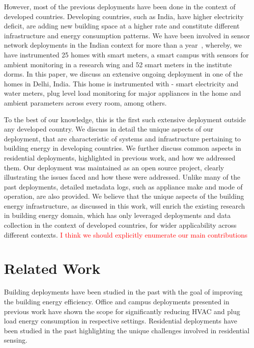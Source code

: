\documentclass[10pt]{sensys-proc}
\newcommand{\redcolor}[1]{\textcolor{red}{#1}}
\begin{document}
 However, most of the previous deployments have been done in the context of developed countries. Developing countries, such as India, have higher electricity deficit, are adding new building space at a higher rate and constitute different infrastructure and energy consumption patterns. %
We have been involved in sensor network deployments in the Indian context for more than a year~\cite{batra}, whereby, we have instrumented 25 homes with smart meters, a smart campus with sensors for ambient monitoring in a research wing and 52 smart meters in the institute dorms. In this paper, we discuss an extensive ongoing deployment in one of the homes in Delhi, India. This home is instrumented with - smart electricity and water meters, plug level load monitoring for major appliances in the home and ambient parameters across every room, among others. 

 To the best of our knowledge, this is the first such extensive deployment outside any developed country. We discuss in detail the unique aspects of our deployment, that are characteristic of systems and infrastructure pertaining to building energy in developing countries. We further discuss common aspects in residential deployments, highlighted in previous work, and how we addressed them. Our deployment was maintained as an open source project, clearly illustrating the issues faced and how these were addressed. Unlike many of the past deployments, detailed metadata logs, such as appliance make and mode of operation, are also provided. We believe that the unique aspects of the building energy infrastructure, as discussed in this work, will enrich the existing research in building energy domain, which has only leveraged deployments and data collection in the context of developed countries, for wider applicability across different contexts. \redcolor{I think we should explicitly enumerate our main contributions}

\vspace{-1mm}
\section{Related Work}
 Building deployments have been studied in the past with the goal of improving the building energy efficiency. Office and campus deployments presented in previous work \cite{yuvraj_ipsn,batra} have shown the scope for significantly reducing HVAC and plug load energy consumption in respective settings. Residential deployments have been studied in the past highlighting the unique challenges involved in residential sensing.
\end{document}
